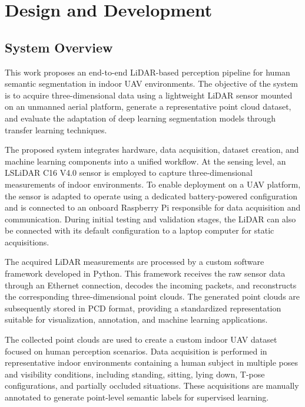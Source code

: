 \chapter{Design and Development}
\label{cha:design-development}

\section{System Overview}
\label{sec:system_overview}

This work proposes an end-to-end LiDAR-based perception pipeline for human semantic segmentation in indoor UAV environments. The objective of the system is to acquire three-dimensional data using a lightweight LiDAR sensor mounted on an unmanned aerial platform, generate a representative point cloud dataset, and evaluate the adaptation of deep learning segmentation models through transfer learning techniques.

The proposed system integrates hardware, data acquisition, dataset creation, and machine learning components into a unified workflow. At the sensing level, an LSLiDAR C16 V4.0 sensor is employed to capture three-dimensional measurements of indoor environments\cite{LSLiDARC16V4}. To enable deployment on a UAV platform, the sensor is adapted to operate using a dedicated battery-powered configuration and is connected to an onboard Raspberry Pi responsible for data acquisition and communication. During initial testing and validation stages, the LiDAR can also be connected with its default configuration to a laptop computer for static acquisitions.

The acquired LiDAR measurements are processed by a custom software framework developed in Python. This framework receives the raw sensor data through an Ethernet connection, decodes the incoming packets, and reconstructs the corresponding three-dimensional point clouds. The generated point clouds are subsequently stored in PCD format, providing a standardized representation suitable for visualization, annotation, and machine learning applications.

The collected point clouds are used to create a custom indoor UAV dataset focused on human perception scenarios. Data acquisition is performed in representative indoor environments containing a human subject in multiple poses and visibility conditions, including standing, sitting, lying down, T-pose configurations, and partially occluded situations. These acquisitions are manually annotated to generate point-level semantic labels for supervised learning.

